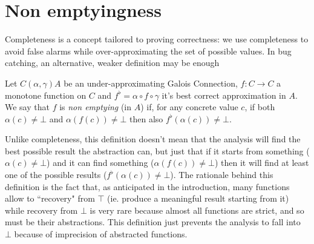 \section{Non emptyingness}
Completeness is a concept tailored to proving correctness: we use completeness to avoid false alarms while over-approximating the set of possible values. In bug catching, an alternative, weaker definition may be enough
\begin{definition}\label{ch3:def:non-emptying}
	Let $C (\alpha, \gamma) A$ be an under-approximating Galois Connection, $f : C \rightarrow C$ a monotone function on $C$ and $f^{\flat} = \alpha \circ f \circ \gamma$ it's best correct approximation in $A$.
	We say that $f$ is \textit{non emptying} (in $A$) if, for any concrete value $c$, if both $\alpha(c) \neq \bot$ and $\alpha(f(c)) \neq \bot$ then also $f^{\flat}(\alpha(c)) \neq \bot$.
\end{definition}

Unlike completeness, this definition doesn't mean that the analysis will find the best possible result the abstraction can, but just that if it starts from something ($\alpha(c) \neq \bot$) and it can find something ($\alpha(f(c)) \neq \bot$) then it will find at least one of the possible results ($f^{\flat}(\alpha(c)) \neq \bot$).
The rationale behind this definition is the fact that, as anticipated in the introduction, many functions allow to ``recovery" from $\top$ (ie. produce a meaningful result starting from it) while recovery from $\bot$ is very rare because almost all functions are strict, and so must be their abstractions. This definition just prevents the analysis to fall into $\bot$ because of imprecision of abstracted functions.


